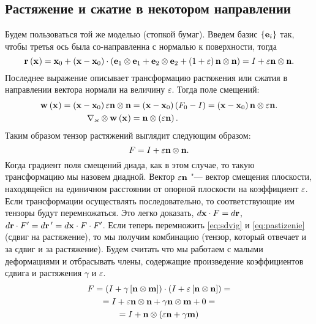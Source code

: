 \documentclass[a4papper, 14pt]{book}
\renewcommand{\epsilon}{\ensuremath{\varepsilon}}
\renewcommand{\kappa}{\ensuremath{\varkappa}}
\newcommand{\diad}{\ensuremath\otimes}
\newcommand{\rx}[3]{\ensuremath\mf{r}_{#3}\left({\mathbf{#1}}_{#2} \right)}
\newcommand{\wx}[3]{\ensuremath\mf{w}_{#3}\left({\mathbf{#1}}_{#2} \right)}
\newcommand{\lf}{\ensuremath \left(}
\newcommand{\ri}{\ensuremath \right)}
\newcommand{\mf}[1]{\ensuremath\mathbf{#1}}
\theoremstyle{plain} %
\theoremstyle{definition} %
\theoremstyle{remark} %
\begin{document}
	\subsection{Растяжение и сжатие в некотором направлении}
	Будем пользоваться той же моделью (стопкой бумаг). Введем базис $\{\mf{e}_i\}$ так, чтобы третья ось была со-направленна с нормалью к поверхности, тогда
	\begin{equation}
	\rx{x}{}{} = \mf{x}_0 + \lf \mf{x} - \mf{x}_0 \ri \cdot\lf \mf{e}_1 \diad\mf{e}_1 + \mf{e}_2 \diad\mf{e}_2 + \lf 1+\epsilon\ri\mf{n}\diad\mf{n}\ri = I + \epsilon\mf{n}\diad\mf{n}.
	\end{equation}
	Последнее выражение описывает трансформацию растяжения или сжатия в направлении вектора нормали на величину $\epsilon$. Тогда поле смещений:
	\begin{align}
	\wx{x}{}{} = \lf\mf{x} - \mf{x}_0\ri \epsilon\mf{n}\diad\mf{n} &= \lf\mf{x} - \mf{x}_0\ri\lf F_0 - I\ri =  \lf\mf{x} - \mf{x}_0\ri \mf{n}\diad\epsilon\mf{n}.\\
	\nabla_{\kappa}\diad\wx{x}{}{}& = \mf{n}\diad\lf\epsilon\mf{n}\ri.
	\end{align}
	Таким образом тензор растяжений выглядит следующим образом:
	\begin{equation}\label{eq:pastizenie}
	F = I + \epsilon\mf{n}\diad\mf{n}.
	\end{equation}
	Когда градиент поля смещений диада, как в этом случае, то такую трансформацию мы назовем диадной. Вектор $\epsilon\mf{n}$ "--- вектор смещения плоскости, находящейся на единичном расстоянии от опорной плоскости на коэффициент \epsilon. \\
	Если трансформации осуществлять последовательно, то соответствующие им тензоры будут перемножаться. Это легко доказать, $d\mf{x}\cdot F = d\mf{r}$, $d\mf{r}\cdot F' = d\mf{r} { \,^\prime} = d\mf{x}\cdot F\cdot F'$. Если теперь перемножить \eqref{eq:sdvig} и \eqref{eq:pastizenie} (сдвиг на растяжение), то мы получим комбинацию (тензор, который отвечает и за сдвиг и за растяжение). Будем считать что мы работаем с малыми деформациями и отбрасывать члены, содержащие произведение коэффициентов сдвига и растяжения $\gamma$ и \epsilon. 
	\begin{multline}
	F = \lf I + \gamma\left[\mf{n}\diad\mf{m}\right] \ri\cdot\lf I + \epsilon\left[\mf{n}\diad\mf{n}\right] \ri=\\ = I + \epsilon
	\mf{n}\diad\mf{n} + \gamma\mf{n}\diad\mf{m} + 0 =\\
	= I +\mf{n}\diad\lf\epsilon\mf{n} + \gamma\mf{m}\ri
	\end{multline}
\end{document}

